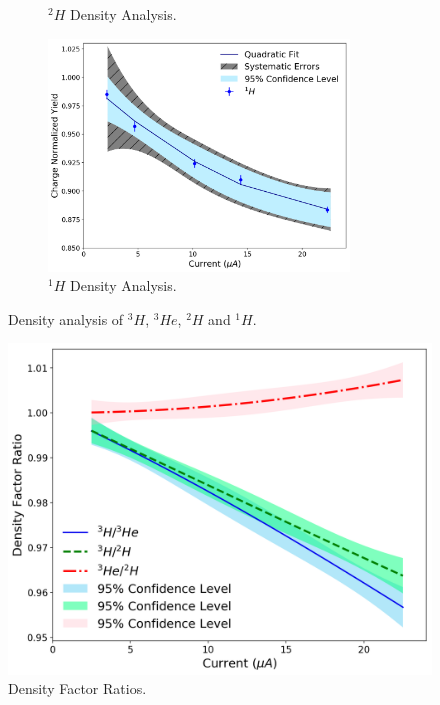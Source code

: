 \documentclass[final,5p,times,twocolumn]{elsarticle}
\begin{document}
\begin{figure}[h]
\begin{center}
\begin{subfigure}{8cm}
    \caption{$^{2}H$ Density Analysis.}
    \label{fig:deuterium_data}
  \end{subfigure}
  \begin{subfigure}{8cm}
    \centering\includegraphics[width=8cm]{hydrogen_data.pdf}
    \caption{$^{1}H$ Density Analysis.}
    \label{fig:hydrogen_data}
  \end{subfigure}
  \end{center}
  \label{fig:tritium_targets}
  \caption{Density analysis of $^{3}H$, $^{3}He$, $^{2}H$ and $^{1}H$.}
\end{figure}




%


\begin{figure}[!h]
 \centering
 \includegraphics[width=\linewidth]{density_factor_ratios.pdf}
  \caption{Density Factor Ratios. }
  \label{fig:density_ratios}
\end{figure}
\end{document}
